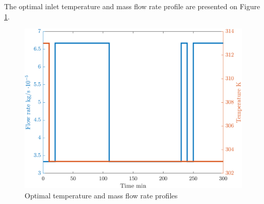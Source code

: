 \documentclass[../Article_Sensitivity_Analsysis.tex]{subfiles}
\begin{document}
	The optimal inlet temperature and mass flow rate profile are presented on Figure \ref{fig:profile}. 
	
	\begin{figure}[h!]
		\centering
		\includegraphics[width=\columnwidth]{Figures/Results/Profile.png}	
		\caption{Optimal temperature and mass flow rate profiles}
		\label{fig:profile}
	\end{figure}
	
\end{document}
